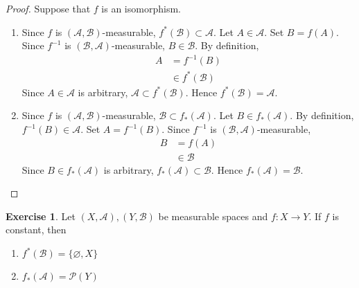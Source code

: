 \documentclass{book}
\theoremstyle{definition}
\newtheorem{ex}[definition]{Exercise}
\newcommand{\MA}{\mathcal{A}}
\newcommand{\MB}{\mathcal{B}}
\newcommand{\MP}{\mathcal{P}}
\DeclareMathOperator*{\0}{\mbf{0}}
\DeclareMathOperator*{\1}{\mbf{1}}
\begin{document}
	\begin{proof} Suppose that $f$ is an isomorphism.
		\begin{enumerate}
			\item Since $f$ is $(\MA, \MB)$-measurable, $f^*(\MB) \subset \MA$. Let $A \in \MA$. Set $B = f(A)$. Since $f^{-1}$ is $(\MB, \MA)$-measurable, $B \in \MB$. By definition, 
			\begin{align*}
				A 
				& = f^{-1}(B) \\
				& \in f^*(\MB)  
			\end{align*}
			Since $A \in \MA$ is arbitrary, $\MA \subset f^*(\MB)$. Hence $f^*(\MB) = \MA$.
			\item Since $f$ is $(\MA, \MB)$-measurable, $\MB \subset f_*(\MA)$. Let $B \in f_*(\MA)$. By definition, $f^{-1}(B) \in \MA$. Set $A = f^{-1}(B)$.  Since $f^{-1}$ is $(\MB, \MA)$-measurable, 
			\begin{align*}
				B
				& = f(A) \\
				& \in \MB
			\end{align*}
			Since $B \in f_*(\MA)$ is arbitrary, $f_*(\MA) \subset \MB$. Hence $f_*(\MA) = \MB$.
		\end{enumerate}
	\end{proof}

	\begin{ex}
		Let $(X,\MA), (Y,\MB)$ be measurable spaces and $f: X \rightarrow Y$. If $f$ is constant, then 
		\begin{enumerate}
			\item $f^*(\MB) = \{\varnothing, X\}$
			\item $f_*(\MA) = \MP(Y)$
		\end{enumerate}
	\end{ex}
\end{document}
